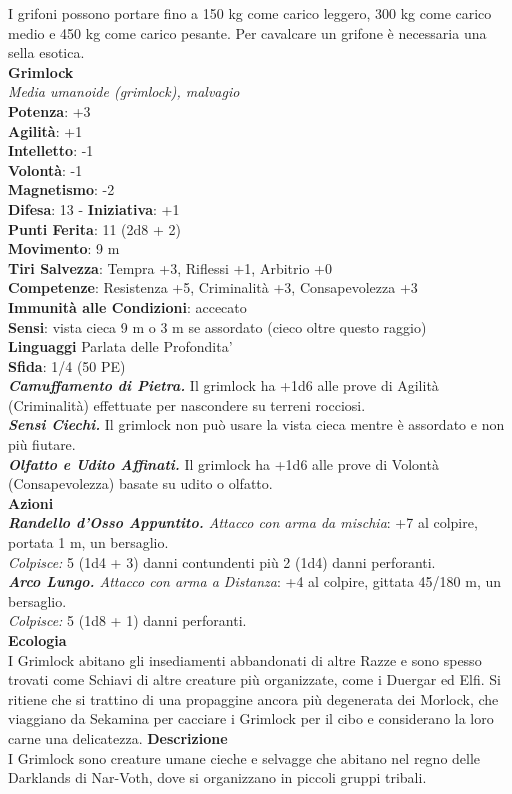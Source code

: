 \begin{multicols}{2}
I grifoni possono portare fino a 150 kg come carico leggero, 300 kg come carico medio e 450 kg come carico pesante. Per cavalcare un grifone è necessaria una sella esotica.\\


\medskip\textbf{Grimlock}\\
\emph{Media umanoide (grimlock), malvagio}\\
\textbf{Potenza}: +3\\
\textbf{Agilità}: +1\\
\textbf{Intelletto}: -1\\
\textbf{Volontà}: -1\\
\textbf{Magnetismo}: -2\\
\textbf{Difesa}: 13 - \textbf{Iniziativa}: +1\\
\textbf{Punti Ferita}: 11 (2d8 + 2)\\
\textbf{Movimento}: 9 m\\
\textbf{Tiri Salvezza}: Tempra +3, Riflessi +1, Arbitrio +0\\
\textbf{Competenze}: Resistenza +5, Criminalità +3, Consapevolezza +3\\
\textbf{Immunità alle Condizioni}: accecato\\
\textbf{Sensi}: vista cieca 9 m o 3 m se assordato (cieco oltre questo raggio)\\
\textbf{Linguaggi} Parlata delle Profondita'\\
\textbf{Sfida}: 1/4 (50 PE)\smallskip\\
\emph{\textbf{Camuffamento di Pietra.}} Il grimlock ha +1d6 alle prove di Agilità (Criminalità) effettuate per nascondere su terreni rocciosi.\\
\emph{\textbf{Sensi Ciechi.}} Il grimlock non può usare la vista cieca mentre è assordato e non più fiutare.\\
\emph{\textbf{Olfatto e Udito Affinati.}} Il grimlock ha +1d6 alle prove di Volontà (Consapevolezza) basate su udito o olfatto.\\
\smallskip\textbf{Azioni}\\
\emph{\textbf{Randello d'Osso Appuntito.} Attacco con arma da mischia}: +7 al colpire, portata 1 m, un bersaglio.\\
\emph{Colpisce:} 5 (1d4 + 3) danni contundenti più 2 (1d4) danni perforanti.\\
\emph{\textbf{Arco Lungo.} Attacco con arma a Distanza}: +4 al colpire, gittata 45/180 m, un bersaglio.\\
\emph{Colpisce:} 5 (1d8 + 1) danni perforanti.\\
\textbf{Ecologia}\\
I Grimlock abitano gli insediamenti abbandonati di altre Razze e sono spesso trovati come Schiavi di altre creature più organizzate, come i Duergar ed Elfi. Si ritiene che si trattino di una propaggine ancora più degenerata dei Morlock, che viaggiano da Sekamina per cacciare i Grimlock per il cibo e considerano la loro carne una delicatezza.
\textbf{Descrizione}\\
I Grimlock sono creature umane cieche e selvagge che abitano nel regno delle Darklands di Nar-Voth, dove si organizzano in piccoli gruppi tribali.\\


\end{multicols}
